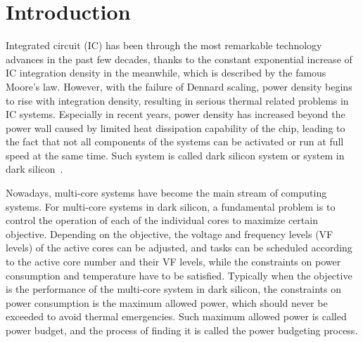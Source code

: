 \section{Introduction}

Integrated circuit (IC) has been through the most remarkable technology advances in the past few decades, thanks to the constant exponential increase of IC integration density in the meanwhile, which is described by the famous Moore's law. However, with the failure of Dennard scaling, power density begins to rise with integration density, resulting in serious thermal related problems in IC systems. Especially in recent years, power density has increased beyond the power wall caused by limited heat dissipation capability of the chip, leading to the fact that not all components of the systems can be activated or run at full speed at the same time. Such system is called dark silicon system or system in dark silicon~\cite{Hardavellas:MICRO'11,Goulding-Hotta:MICRO'11,Esmaeilzadeh:MICRO'12,Taylor:DAC'12,Taylor:MICRO'13,WangMa:TODAES'16}.

Nowadays, multi-core systems have become the main stream of computing systems. For multi-core systems in dark silicon, a fundamental problem is to control the operation of each of the individual cores to maximize certain objective. Depending on the objective, the voltage and frequency levels (VF levels) of the active cores can be adjusted, and tasks can be scheduled according to the active core number and their VF levels, while the constraints on power consumption and temperature have to be satisfied. Typically when the objective is the performance of the multi-core system in dark silicon, the constraints on power consumption is the maximum allowed power, which should never be exceeded to avoid thermal emergencies. Such maximum allowed power is called power budget, and the process of finding it is called the power budgeting process. 

